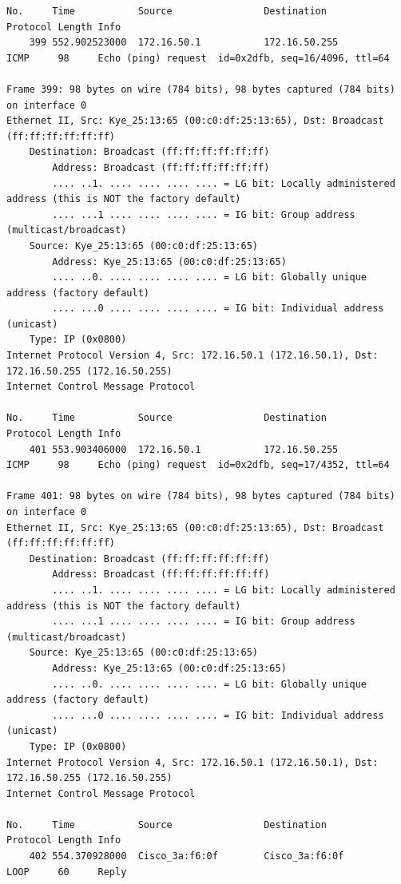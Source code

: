 \documentclass[a4paper,11pt]{article}
\begin{document}
\begin{lstlisting}
No.     Time           Source                Destination           Protocol Length Info
    399 552.902523000  172.16.50.1           172.16.50.255         ICMP     98     Echo (ping) request  id=0x2dfb, seq=16/4096, ttl=64

Frame 399: 98 bytes on wire (784 bits), 98 bytes captured (784 bits) on interface 0
Ethernet II, Src: Kye_25:13:65 (00:c0:df:25:13:65), Dst: Broadcast (ff:ff:ff:ff:ff:ff)
    Destination: Broadcast (ff:ff:ff:ff:ff:ff)
        Address: Broadcast (ff:ff:ff:ff:ff:ff)
        .... ..1. .... .... .... .... = LG bit: Locally administered address (this is NOT the factory default)
        .... ...1 .... .... .... .... = IG bit: Group address (multicast/broadcast)
    Source: Kye_25:13:65 (00:c0:df:25:13:65)
        Address: Kye_25:13:65 (00:c0:df:25:13:65)
        .... ..0. .... .... .... .... = LG bit: Globally unique address (factory default)
        .... ...0 .... .... .... .... = IG bit: Individual address (unicast)
    Type: IP (0x0800)
Internet Protocol Version 4, Src: 172.16.50.1 (172.16.50.1), Dst: 172.16.50.255 (172.16.50.255)
Internet Control Message Protocol

No.     Time           Source                Destination           Protocol Length Info
    401 553.903406000  172.16.50.1           172.16.50.255         ICMP     98     Echo (ping) request  id=0x2dfb, seq=17/4352, ttl=64

Frame 401: 98 bytes on wire (784 bits), 98 bytes captured (784 bits) on interface 0
Ethernet II, Src: Kye_25:13:65 (00:c0:df:25:13:65), Dst: Broadcast (ff:ff:ff:ff:ff:ff)
    Destination: Broadcast (ff:ff:ff:ff:ff:ff)
        Address: Broadcast (ff:ff:ff:ff:ff:ff)
        .... ..1. .... .... .... .... = LG bit: Locally administered address (this is NOT the factory default)
        .... ...1 .... .... .... .... = IG bit: Group address (multicast/broadcast)
    Source: Kye_25:13:65 (00:c0:df:25:13:65)
        Address: Kye_25:13:65 (00:c0:df:25:13:65)
        .... ..0. .... .... .... .... = LG bit: Globally unique address (factory default)
        .... ...0 .... .... .... .... = IG bit: Individual address (unicast)
    Type: IP (0x0800)
Internet Protocol Version 4, Src: 172.16.50.1 (172.16.50.1), Dst: 172.16.50.255 (172.16.50.255)
Internet Control Message Protocol

No.     Time           Source                Destination           Protocol Length Info
    402 554.370928000  Cisco_3a:f6:0f        Cisco_3a:f6:0f        LOOP     60     Reply


\end{lstlisting}
\end{document}
